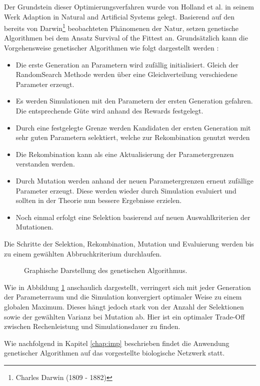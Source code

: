 		Der Grundstein dieser Optimierungsverfahren wurde von Holland et al. in seinem Werk \glqq Adaption in Natural and Artificial Systems\grqq{} \cite{Holland1992} gelegt. Basierend auf den bereits von Darwin\footnote{Charles Darwin (1809 - 1882)} beobachteten Phänomenen der Natur, setzen genetische Algorithmen bei dem Ansatz \glqq Survival of the Fittest\grqq{} an. Grundsätzlich kann die Vorgehensweise genetischer Algorithmen wie folgt dargestellt werden \cite{Goldberg1989}:
		\begin{itemize}
			\item Die erste Generation an Parametern wird zufällig initialisiert. Gleich der RandomSearch Methode werden über eine Gleichverteilung verschiedene Parameter erzeugt.
			\item Es werden Simulationen mit den Parametern der ersten Generation gefahren. Die entsprechende Güte wird anhand des Rewards festgelegt.
			\item Durch eine festgelegte Grenze werden Kandidaten der ersten Generation mit sehr guten Parametern selektiert, welche zur Rekombination genutzt werden
			\item Die Rekombination kann als eine Aktualisierung der Parametergrenzen verstanden werden.
			\item Durch Mutation werden anhand der neuen Parametergrenzen erneut zufällige Parameter erzeugt. Diese werden wieder durch Simulation evaluiert und sollten in der Theorie nun bessere Ergebnisse erzielen.
			\item Noch einmal erfolgt eine Selektion basierend auf neuen Auswahlkriterien der Mutationen.
		\end{itemize}
		Die Schritte der Selektion, Rekombination, Mutation und Evaluierung werden bis zu einem gewählten Abbruchkriterium durchlaufen.
		\begin{figure}[H] %
			\centering
			\def\svgwidth{12cm}
			
			\caption{Graphische Darstellung des genetischen Algorithmus.}
			\label{fig:gen_chart}
		\end{figure}
		Wie in Abbildung \ref{fig:gen_chart} anschaulich dargestellt, verringert sich mit jeder Generation der Parameterraum und die Simulation konvergiert optimaler Weise zu einem globalen Maximum. Dieses hängt jedoch stark von der Anzahl der Selektionen sowie der gewählten Varianz bei Mutation ab. Hier ist ein optimaler Trade-Off zwischen Rechenleistung und Simulationsdauer zu finden.
		
		Wie nachfolgend in Kapitel \ref{chap:imp} beschrieben findet die Anwendung genetischer Algorithmen auf das vorgestellte biologische Netzwerk statt.
